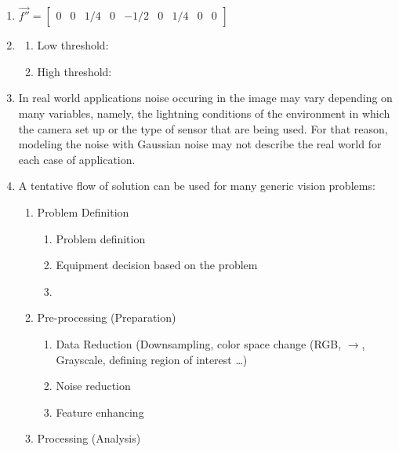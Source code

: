 \documentclass{article}
\begin{document}
\begin{enumerate}
	\item $ \vec{f''} = \begin{bmatrix} 0 & 0 & 1/4 & 0 & -1/2 & 0 & 1/4 & 0 & 0
	\end{bmatrix}$
	\item
	\begin{enumerate}
		\item Low threshold:
		\item High threshold:	
	\end{enumerate}
	\item In real world applications noise occuring in the image may vary
	depending on many variables, namely, the lightning conditions of the
	environment in which the camera set up or the type of sensor that are being
	used. For that reason, modeling the noise with Gaussian noise may not describe
	the real world for each case of application. 
	\item A tentative flow of solution can be used for many generic vision
	problems:
	\begin{enumerate}
		\item Problem Definition
		\begin{enumerate}
			\item Problem definition
			\item Equipment decision based on the problem
			\item 
		\end{enumerate}
		\item Pre-processing (Preparation)
		\begin{enumerate}
			\item Data Reduction (Downsampling, color space change (RGB, $\to$,
			Grayscale, defining region of interest \ldots)
			\item Noise reduction
			\item Feature enhancing 
		\end{enumerate}
		\item Processing (Analysis)

\end{enumerate}
\end{enumerate}
\end{document}
